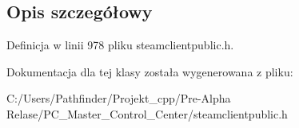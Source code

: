 \subsection{Opis szczegółowy}


Definicja w linii 978 pliku steamclientpublic.\+h.



Dokumentacja dla tej klasy została wygenerowana z pliku\+:\begin{DoxyCompactItemize}
\item 
C\+:/\+Users/\+Pathfinder/\+Projekt\+\_\+cpp/\+Pre-\/\+Alpha Relase/\+P\+C\+\_\+\+Master\+\_\+\+Control\+\_\+\+Center/steamclientpublic.\+h\end{DoxyCompactItemize}
